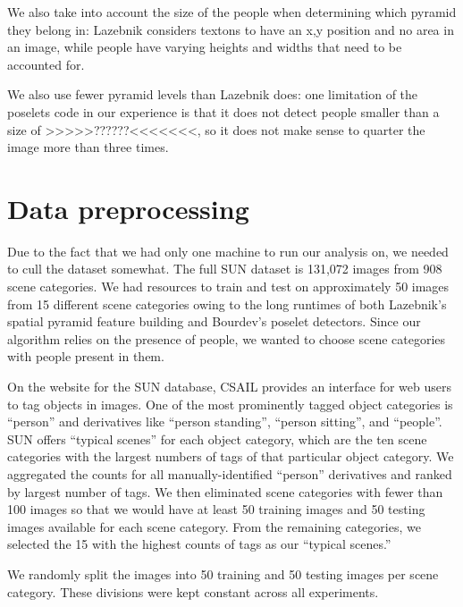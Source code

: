 \documentclass[11pt]{article}
\begin{document}
We also take into account the size of the people when determining which pyramid they belong in: Lazebnik considers textons to have an x,y position and no area in an image, while people have varying heights and widths that need to be accounted for.

We also use fewer pyramid levels than Lazebnik does: one limitation of the poselets code in our experience is that it does not detect people smaller than a size of >>>>>??????<<<<<<<, so it does not make sense to quarter the image more than three times.

\section{Data preprocessing}

Due to the fact that we had only one machine to run our analysis on, we needed to cull the dataset somewhat.  The full SUN dataset is 131,072 images from 908 scene categories.  We had resources to train and test on approximately 50 images from 15 different scene categories owing to the long runtimes of both Lazebnik's spatial pyramid feature building and Bourdev's poselet detectors.  Since our algorithm relies on the presence of people, we wanted to choose scene categories with people present in them.

On the website for the SUN database, CSAIL provides an interface for web users to tag objects in images.  One of the most prominently tagged object categories is ``person'' and derivatives like ``person standing'', ``person sitting'', and ``people''.  SUN offers ``typical scenes'' for each object category, which are the ten scene categories with the largest numbers of tags of that particular object category.  We aggregated the counts for all manually-identified ``person'' derivatives and ranked by largest number of tags.  We then eliminated scene categories with fewer than 100 images so that we would have at least 50 training images and 50 testing images available for each scene category.  From the remaining categories, we selected the 15 with the highest counts of tags as our ``typical scenes.''

We randomly split the images into 50 training and 50 testing images per scene category.  These divisions were kept constant across all experiments.

\end{document}
